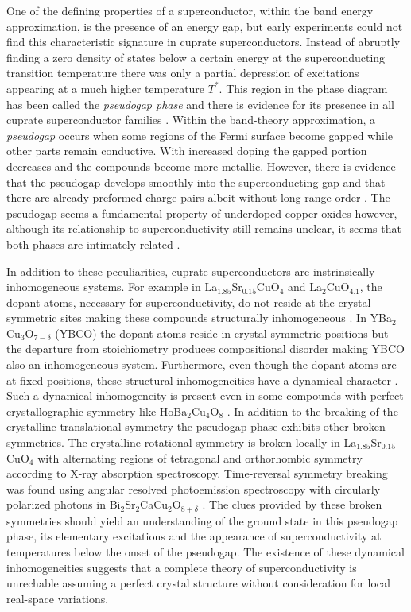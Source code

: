 One of the defining properties of a superconductor, within the band energy approximation, is the presence of an energy gap, but early experiments could not find this characteristic signature in cuprate superconductors.
Instead of abruptly finding a zero density of states below a certain energy at the superconducting transition temperature there was only a partial depression of excitations appearing at a much higher temperature $T^*$.
This region in the phase diagram has been called the \textit{pseudogap phase} and there is evidence for its presence in all cuprate superconductor families \cite{Timusk1999,Muller2007}.
Within the band-theory approximation, a \textit{pseudogap} occurs when some regions of the Fermi surface become gapped while other parts remain conductive. 
With increased doping the gapped portion decreases and the compounds become more metallic. 
However, there is evidence that the pseudogap develops smoothly into the superconducting gap and that there are already preformed charge pairs albeit without long range order \cite{Orenstein2000}. 
The pseudogap seems a fundamental property of underdoped copper oxides however, although its relationship to superconductivity still remains unclear, it seems that both phases are intimately related \cite{Basov2005}.

In addition to these peculiarities, cuprate superconductors are instrinsically inhomogeneous systems.
For example in La$_{1.85}$Sr$_{0.15}$CuO$_{4}$ and La$_{2}$CuO$_{4.1}$, the dopant atoms, necessary for superconductivity, do not reside at the crystal symmetric sites making these compounds structurally inhomogeneous \cite{Poccia2011}.
In YBa$_2$Cu$_3$O$_{7-\delta}$ (YBCO) the dopant atoms reside in crystal symmetric positions but the departure from stoichiometry produces compositional disorder \cite{Chen1988,Andersen1990} making YBCO also an inhomogeneous system.
Furthermore, even though the dopant atoms are at fixed positions, these structural inhomogeneities have a dynamical character \cite{Mihailovic2005,Bianconi1996}.
Such a dynamical inhomogeneity is present even in some compounds with perfect crystallographic symmetry like HoBa$_{2}$Cu$_{4}$O$_{8}$ \cite{RubioTemprano2000}.
In addition to the breaking of the crystalline translational symmetry the pseudogap phase exhibits other broken symmetries. 
The crystalline rotational symmetry is broken locally in La$_{1.85}$Sr$_{0.15}$CuO$_{4}$ with alternating regions of tetragonal and orthorhombic symmetry \cite{Bianconi1996} according to X-ray absorption spectroscopy. 
Time-reversal symmetry breaking was found using angular resolved photoemission spectroscopy with circularly polarized photons in Bi$_{2}$Sr$_{2}$CaCu$_{2}$O$_{8+\delta}$ \cite{Kaminski2002}. 
The clues provided by these broken symmetries should yield an understanding of the ground state in this pseudogap phase, its elementary excitations and the appearance of superconductivity at temperatures below the onset of the pseudogap. 
The existence of these dynamical inhomogeneities suggests that a complete theory of superconductivity is unrechable assuming a perfect crystal structure without consideration for local real-space variations.

